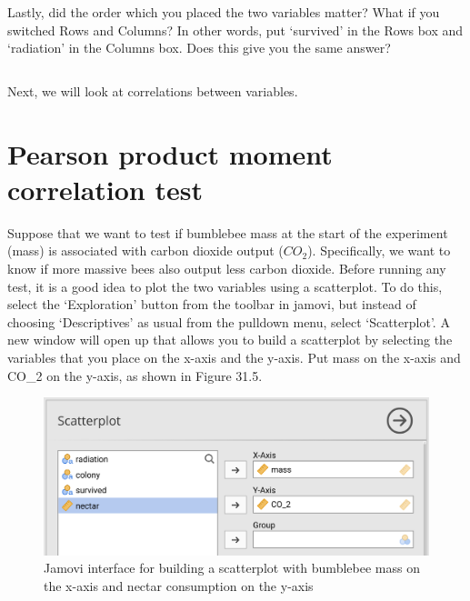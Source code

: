 \documentclass[
]{scrbook}
\begin{document}
\begin{verbatim}



\end{verbatim}

Lastly, did the order which you placed the two variables matter?
What if you switched Rows and Columns?
In other words, put `survived' in the Rows box and `radiation' in the Columns box.
Does this give you the same answer?

\begin{verbatim}

\end{verbatim}

Next, we will look at correlations between variables.

\hypertarget{pearson-product-moment-correlation-test}{%
\section{Pearson product moment correlation test}\label{pearson-product-moment-correlation-test}}

Suppose that we want to test if bumblebee mass at the start of the experiment (mass) is associated with carbon dioxide output (\(CO_{2}\)).
Specifically, we want to know if more massive bees also output less carbon dioxide.
Before running any test, it is a good idea to plot the two variables using a scatterplot.
To do this, select the `Exploration' button from the toolbar in jamovi, but instead of choosing `Descriptives' as usual from the pulldown menu, select `Scatterplot'.
A new window will open up that allows you to build a scatterplot by selecting the variables that you place on the x-axis and the y-axis.
Put mass on the x-axis and CO\_2 on the y-axis, as shown in Figure 31.5.

\begin{figure}
\includegraphics[width=1\linewidth]{img/jamovi_simple_scatterplot} \caption{Jamovi interface for building a scatterplot with bumblebee mass on the x-axis and nectar consumption on the y-axis}\label{fig:unnamed-chunk-156}
\end{figure}
\end{document}
